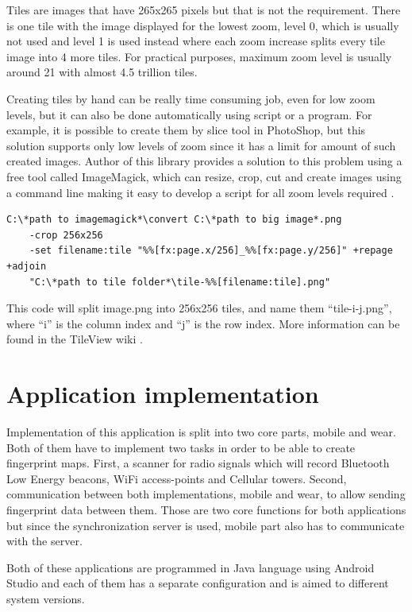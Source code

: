 Tiles are images that have 265x265 pixels but that is not the requirement. There is one tile with the image displayed for the lowest zoom, level 0, which is usually not used and level 1 is used instead where each zoom increase splits every tile image into 4 more tiles. For practical purposes, maximum zoom level is usually around 21 with almost 4.5 trillion tiles.

Creating tiles by hand can be really time consuming job, even for low zoom levels, but it can also be done automatically using script or a program. For example, it is possible to create them by slice tool in PhotoShop, but this solution supports only low levels of zoom since it has a limit for amount of such created images. Author of this library provides a solution to this problem using a free tool called ImageMagick, which can resize, crop, cut and create images using a command line making it easy to develop a script for all zoom levels required \cite{TileView}.

\begin{lstlisting}[caption=Creating tiles using ImageMagick]
C:\*path to imagemagick*\convert C:\*path to big image*.png 
	-crop 256x256 
	-set filename:tile "%%[fx:page.x/256]_%%[fx:page.y/256]" +repage +adjoin 
	"C:\*path to tile folder*\tile-%%[filename:tile].png"
\end{lstlisting}

This code will split image.png into 256x256 tiles, and name them \enquote{tile-i-j.png}, where \enquote{i} is the column index and \enquote{j} is the row index. More information can be found in the TileView wiki \cite{TileViewWiki}.

\section{Application implementation}\label{sec:ApplicationImplementation}
Implementation of this application is split into two core parts, mobile and wear. Both of them have to implement two tasks in order to be able to create fingerprint maps. First, a scanner for radio signals which will record Bluetooth Low Energy beacons, WiFi access-points and Cellular towers. Second, communication between both implementations, mobile and wear, to allow sending fingerprint data between them. Those are two core functions for both applications but since the synchronization server is used, mobile part also has to communicate with the server.

Both of these applications are programmed in Java language using Android Studio and each of them has a separate configuration and is aimed to different system versions.

